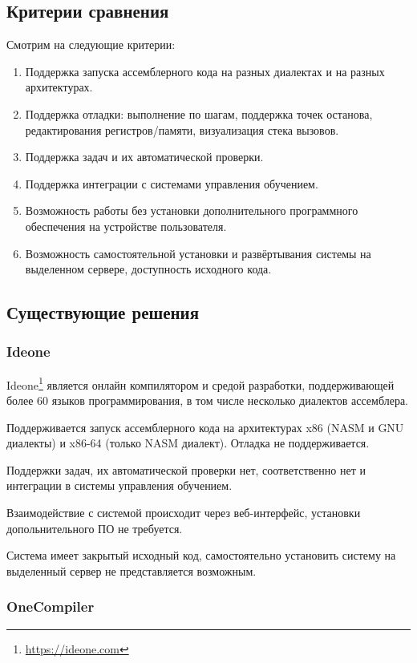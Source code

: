 \documentclass[a4paper,article,14pt]{extarticle}
\begin{document}
\subsection{Критерии сравнения}

Смотрим на следующие критерии:

\begin{enumerate}
    \item Поддержка запуска ассемблерного кода на разных диалектах и на разных архитектурах.
    \item Поддержка отладки: выполнение по шагам, поддержка точек останова, редактирования регистров/памяти, визуализация стека вызовов.
    \item Поддержка задач и их автоматической проверки.
    \item Поддержка интеграции с системами управления обучением.
    \item Возможность работы без установки дополнительного программного обеспечения на устройстве пользователя.
    \item Возможность самостоятельной установки и развёртывания системы на выделенном сервере, доступность исходного кода.
\end{enumerate}

\subsection{Существующие решения}
\subsubsection{Ideone}

Ideone\footnote{\url{https://ideone.com}} является онлайн компилятором и средой разработки, поддерживающей более 60 языков программирования, в том числе несколько диалектов ассемблера.

Поддерживается запуск ассемблерного кода на архитектурах x86 (NASM и GNU диалекты) и x86-64 (только NASM диалект). Отладка не поддерживается.

Поддержки задач, их автоматической проверки нет, соответственно нет и интеграции в системы управления обучением.

Взаимодействие с системой происходит через веб-интерфейс, установки допольнительного ПО не требуется.

Система имеет закрытый исходный код, самостоятельно установить систему на выделенный сервер не представляется возможным.

\subsubsection{OneCompiler}
\end{document}
